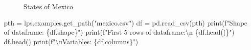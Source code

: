 \documentclass[
  a4paper, 
  twoside,
  final
]{article}
\newenvironment{Shaded}{\begin{snugshade}}{\end{snugshade}}
\newcommand{\BuiltInTok}[1]{\textcolor[rgb]{0.00,0.23,0.31}{#1}}
\newcommand{\CharTok}[1]{\textcolor[rgb]{0.13,0.47,0.30}{#1}}
\newcommand{\NormalTok}[1]{\textcolor[rgb]{0.00,0.23,0.31}{#1}}
\newcommand{\OperatorTok}[1]{\textcolor[rgb]{0.37,0.37,0.37}{#1}}
\newcommand{\SpecialCharTok}[1]{\textcolor[rgb]{0.37,0.37,0.37}{#1}}
\newcommand{\SpecialStringTok}[1]{\textcolor[rgb]{0.13,0.47,0.30}{#1}}
\newcommand{\StringTok}[1]{\textcolor[rgb]{0.13,0.47,0.30}{#1}}
\begin{document}
\begin{figure}


\caption{\label{fig-states}States of Mexico}

\end{figure}%

\begin{Shaded}
\begin{Highlighting}[]
\NormalTok{pth }\OperatorTok{=}\NormalTok{ lps.examples.get\_path(}\StringTok{"mexico.csv"}\NormalTok{)}
\NormalTok{df }\OperatorTok{=}\NormalTok{ pd.read\_csv(pth)}
\BuiltInTok{print}\NormalTok{(}\SpecialStringTok{f"Shape of dataframe: }\SpecialCharTok{\{}\NormalTok{df}\SpecialCharTok{.}\NormalTok{shape}\SpecialCharTok{\}}\SpecialStringTok{"}\NormalTok{)}
\BuiltInTok{print}\NormalTok{(}\SpecialStringTok{f"First 5 rows of dataframe:}\CharTok{\textbackslash{}n}\SpecialStringTok{ }\SpecialCharTok{\{}\NormalTok{df}\SpecialCharTok{.}\NormalTok{head()}\SpecialCharTok{\}}\SpecialStringTok{"}\NormalTok{)}
\NormalTok{df.head()}
\BuiltInTok{print}\NormalTok{(}\SpecialStringTok{f"}\CharTok{\textbackslash{}n}\SpecialStringTok{Variables: }\SpecialCharTok{\{}\NormalTok{df}\SpecialCharTok{.}\NormalTok{columns}\SpecialCharTok{\}}\SpecialStringTok{"}\NormalTok{)}
\end{Highlighting}
\end{Shaded}
\end{document}
